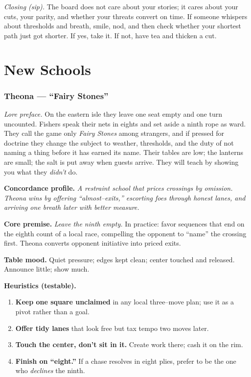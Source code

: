 \documentclass[11pt]{article}
\begin{document}
\begin{itemize}
\medskip
\noindent\textit{Closing (sip).} The board does not care about your stories; it cares about your cuts, your parity, and whether your threats convert on time. If someone whispers about thresholds and breath, smile, nod, and then check whether your shortest path just got shorter. If yes, take it. If not, have tea and thicken a cut.

\clearpage
\section{New Schools}
\label{app:schools}
{}

\subsubsection{Theona — “Fairy Stones”}
\label{school:theona}
{}

\noindent\textit{Lore preface.} On the eastern isle they leave one seat empty and one turn uncounted. Fishers speak their nets in eights and set aside a ninth rope as ward. They call the game only \emph{Fairy Stones} among strangers, and if pressed for doctrine they change the subject to weather, thresholds, and the duty of not naming a thing before it has earned its name. Their tables are low; the lanterns are small; the salt is put away when guests arrive. They will teach by showing you what they \emph{didn’t} do.

\medskip
\noindent\textbf{Concordance profile.} \emph{A restraint school that prices crossings by omission. Theona wins by offering “almost–exits,” escorting foes through honest lanes, and arriving one breath later with better measure.}

\medskip
\noindent\textbf{Core premise.} \textit{Leave the ninth empty.} In practice: favor sequences that end on the eighth count of a local race, compelling the opponent to “name” the crossing first. Theona converts opponent initiative into priced exits.

\medskip
\noindent\textbf{Table mood.} Quiet pressure; edges kept clean; center touched and released. Announce little; show much.

\medskip
\noindent\textbf{Heuristics (testable).}
\begin{enumerate}\setlength\itemsep{0.25em}
  \item \textbf{Keep one square unclaimed} in any local three–move plan; use it as a pivot rather than a goal.
  \item \textbf{Offer tidy lanes} that look free but tax tempo two moves later.
  \item \textbf{Touch the center, don’t sit in it.} Create work there; cash it on the rim.
  \item \textbf{Finish on “eight.”} If a chase resolves in eight plies, prefer to be the one who \emph{declines} the ninth.
\end{enumerate}


\end{itemize}
\end{document}
